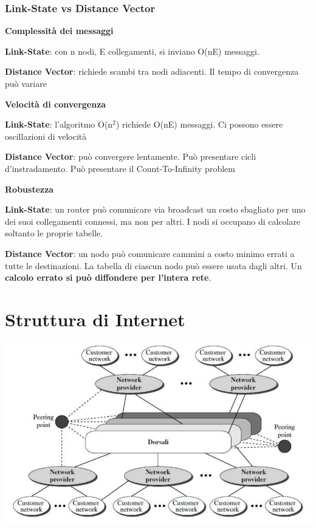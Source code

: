 \documentclass[10pt]{article}
\begin{document}
\subsubsection{Link-State vs Distance Vector}
\begin{list}{}{}
	\item \textbf{Complessità dei messaggi}
	\begin{list}{}{}
		\item \textbf{Link-State}: con n nodi, E collegamenti, si inviano O(nE) messaggi.
		\item \textbf{Distance Vector}: richiede scambi tra nodi adiacenti. Il tempo di convergenza può variare
	\end{list}
	\item \textbf{Velocità di convergenza}
	\begin{list}{}{}
		\item \textbf{Link-State}: l'algoritmo O(n$^2$) richiede O(nE) messaggi. Ci possono essere oscillazioni di velocità
		\item \textbf{Distance Vector}: può convergere lentamente. Può presentare cicli d'instradamento. Può presentare il Count-To-Infinity problem
	\end{list}
	\item \textbf{Robustezza}
	\begin{list}{}{}
		\item \textbf{Link-State}: un router può comunicare via broadcast un costo sbagliato per uno dei suoi collegamenti connessi, ma non per altri. I nodi si occupano di calcolare soltanto le proprie tabelle.
		\item \textbf{Distance Vector}: un nodo può comunicare cammini a costo minimo errati a tutte le destinazioni. La tabella di ciascun nodo può essere usata dagli altri. Un \textbf{calcolo errato si può diffondere per l'intera rete}.
	\end{list}
\end{list}
\pagebreak
\section{Struttura di Internet}
\begin{center}
	\includegraphics[scale=0.7]{strutturainternet.png}
\end{center}
\end{document}

